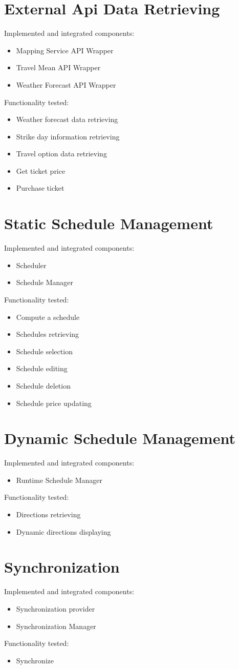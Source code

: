 \section{External Api Data Retrieving}
Implemented and integrated components:
\begin{itemize}
\item Mapping Service API Wrapper
\item Travel Mean API Wrapper
\item Weather Forecast API Wrapper
\end{itemize}
Functionality tested:
\begin{itemize}
\item Weather forecast data retrieving
\item Strike day information retrieving
\item Travel option data retrieving
\item Get ticket price
\item Purchase ticket
\end{itemize}

\section{Static Schedule Management}
Implemented and integrated components:
\begin{itemize}
\item Scheduler
\item Schedule Manager
\end{itemize}
Functionality tested:
\begin{itemize}
\item Compute a schedule
\item Schedules retrieving
\item Schedule selection
\item Schedule editing
\item Schedule deletion
\item Schedule price updating
\end{itemize}

\section{Dynamic Schedule Management}
Implemented and integrated components:
\begin{itemize}
\item Runtime Schedule Manager
\end{itemize}
Functionality tested:
\begin{itemize}
\item Directions retrieving
\item Dynamic directions displaying
\end{itemize}

\section{Synchronization}
Implemented and integrated components:
\begin{itemize}
\item Synchronization provider
\item Synchronization Manager
\end{itemize}
Functionality tested:
\begin{itemize}
\item Synchronize
\end{itemize}

